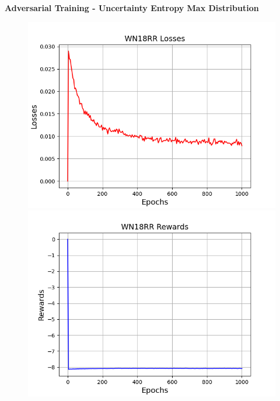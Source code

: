 \textbf{Adversarial Training - Uncertainty Entropy Max Distribution}\\
\begin{figure}
    \centering
    \begin{minipage}{.5\textwidth}
      \centering
      \includegraphics[width=0.9\linewidth]{figures/results/WN18RR/AdversarialTraining/Uncertainty/Max_Entropy_Distribution/gan_train_wn18rr_losses.png}
    \end{minipage}%
    \begin{minipage}{.5\textwidth}
      \centering
      \includegraphics[width=0.9\linewidth]{figures/results/WN18RR/AdversarialTraining/Uncertainty/Max_Entropy_Distribution/gan_train_wn18rr_rewards.png}
    \end{minipage}
    \begin{minipage}{.5\textwidth}
      \centering

\end{minipage}
\end{figure}
